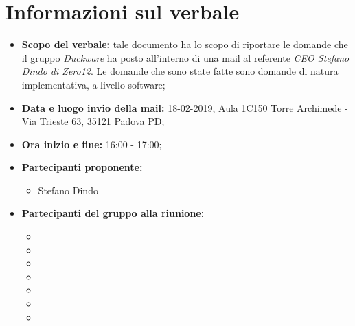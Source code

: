 \clearpage
\section{Informazioni sul verbale}
\begin{itemize}
	\item \textbf {Scopo del verbale:} tale documento ha lo scopo di riportare le domande che il gruppo \emph{Duckware} ha posto all'interno di una mail al referente \emph{CEO Stefano Dindo di Zero12}. Le domande che sono state fatte sono domande di natura implementativa, a livello software;
	\item \textbf {Data e luogo invio della mail:} 18-02-2019, Aula 1C150 Torre Archimede - Via Trieste 63, 35121 Padova PD;
	\item \textbf {Ora inizio e fine:} 16:00 - 17:00;
	\item \textbf {Partecipanti proponente:} 
		\begin{itemize}
			\item Stefano Dindo
		\end{itemize}
	\item \textbf {Partecipanti del gruppo alla riunione:} 
		 \begin{itemize}
			\item \sonia
			\item \luca
			\item \matteo
			\item \pardeep
			\item \alberto
			\item \alessandro
			\item \andrea
		\end{itemize}
\end{itemize}